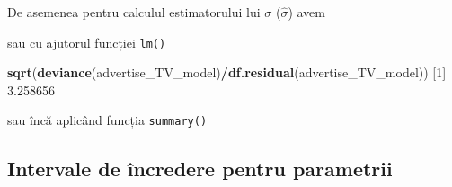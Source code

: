 \documentclass[]{article}
\newenvironment{Shaded}{\begin{snugshade}}{\end{snugshade}}
\newcommand{\KeywordTok}[1]{\textcolor[rgb]{0.13,0.29,0.53}{\textbf{#1}}}
\newcommand{\DecValTok}[1]{\textcolor[rgb]{0.00,0.00,0.81}{#1}}
\newcommand{\FloatTok}[1]{\textcolor[rgb]{0.00,0.00,0.81}{#1}}
\newcommand{\StringTok}[1]{\textcolor[rgb]{0.31,0.60,0.02}{#1}}
\newcommand{\CommentTok}[1]{\textcolor[rgb]{0.56,0.35,0.01}{\textit{#1}}}
\newcommand{\OperatorTok}[1]{\textcolor[rgb]{0.81,0.36,0.00}{\textbf{#1}}}
\newcommand{\NormalTok}[1]{#1}
\begin{document}
De asemenea pentru calculul estimatorului lui \(\sigma\)
(\(\hat{\sigma}\)) avem

\begin{Shaded}
\end{Shaded}

sau cu ajutorul funcției \texttt{lm()}

\begin{Shaded}
\begin{Highlighting}[]
\KeywordTok{sqrt}\NormalTok{(}\KeywordTok{deviance}\NormalTok{(advertise_TV_model)}\OperatorTok{/}\KeywordTok{df.residual}\NormalTok{(advertise_TV_model))}
\NormalTok{[}\DecValTok{1}\NormalTok{] }\FloatTok{3.258656}
\end{Highlighting}
\end{Shaded}

sau încă aplicând funcția \texttt{summary()}

\begin{Shaded}
\end{Shaded}

\subsection{Intervale de încredere pentru
parametrii}\label{intervale-de-incredere-pentru-parametrii}
\end{document}
